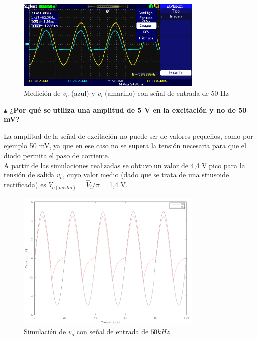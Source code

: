 \begin{figure}[H]
  \centering
      \includegraphics[width=0.8\textwidth]{gfxsantiago/FIG_MED_Rectificador_Simple_3A1.png}
  \caption{Medición de $v_{o}$ (azul) y $v_{i}$ (amarillo) con señal de entrada de 50 Hz}
\end{figure}

\noindent$\blacktriangle$\textbf{ ¿Por qué se utiliza una amplitud de 5 V en la excitación y no de 50 mV?}

La amplitud de la señal de excitación no puede ser de valores pequeños, como por ejemplo 50 mV, ya que en ese caso no se supera la tensión necesaria para que el diodo permita el paso de corriente.\\

A partir de las simulaciones realizadas se obtuvo un valor de 4,4 V pico para la tensión de salida $v_{o}$, cuyo valor medio (dado que se trata de una sinusoide rectificada) es $V_{o (medio)} = \hat{V}_{i}/\pi$ = 1,4 V.\\

\begin{figure}[H]
  \centering
      \includegraphics[width=0.8\textwidth]{gfxsantiago/FIG_SIM_Rectificador_Simple_3A2.png}
  \caption{Simulación de $v_{o}$ con señal de entrada de $50kHz$}
  \label{fig:sim_3A2}
\end{figure}

